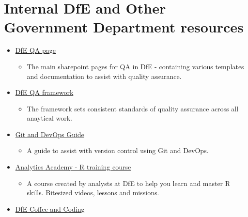\documentclass[
]{book}
\providecommand{\tightlist}{%
  \setlength{\itemsep}{0pt}\setlength{\parskip}{0pt}}
\begin{document}
\hypertarget{internal-dfe-and-other-government-department-resources}{%
\section{Internal DfE and Other Government Department resources}\label{internal-dfe-and-other-government-department-resources}}

\begin{itemize}
\tightlist
\item
  \href{https://educationgovuk.sharepoint.com/sites/sarpi/g/SitePages/Quality-Assurance.aspx}{DfE QA page}

  \begin{itemize}
  \tightlist
  \item
    The main sharepoint pages for QA in DfE - containing various templates and documentation to assist with quality assurance.
  \end{itemize}
\item
  \href{https://educationgovuk.sharepoint.com/:w:/r/sites/sarpi/g/_layouts/15/Doc.aspx?sourcedoc=\%7BE1DED116-2A85-4754-993F-A6E458DA3A59\%7D\&file=Quality\%20Assurance\%20of\%20Models\%20at\%20DfE_April_2020.docx\&action=default\&mobileredirect=true}{DfE QA framework}

  \begin{itemize}
  \tightlist
  \item
    The framework sets consistent standards of quality assurance across all anaytical work.
  \end{itemize}
\item
  \href{https://dfe-analytical-services.github.io/vsts-for-analysis/}{Git and DevOps Guide}

  \begin{itemize}
  \tightlist
  \item
    A guide to assist with version control using Git and DevOps.
  \end{itemize}
\item
  \href{https://educationgovuk.sharepoint.com/sites/DAN/Data\%20Science/The\%20Analytics\%20Academy\%20-\%20An\%20R\%20training\%20course.aspx}{Analytics Academy - R training course}

  \begin{itemize}
  \tightlist
  \item
    A course created by analysts at DfE to help you learn and master R skills. Bitesized videos, lessons and missions.
  \end{itemize}
\item
  \href{https://educationgovuk.sharepoint.com/sites/sarpi/g/AC/Coffee\%20and\%20Coding.aspx}{DfE Coffee and Coding}


\end{itemize}
\end{document}
